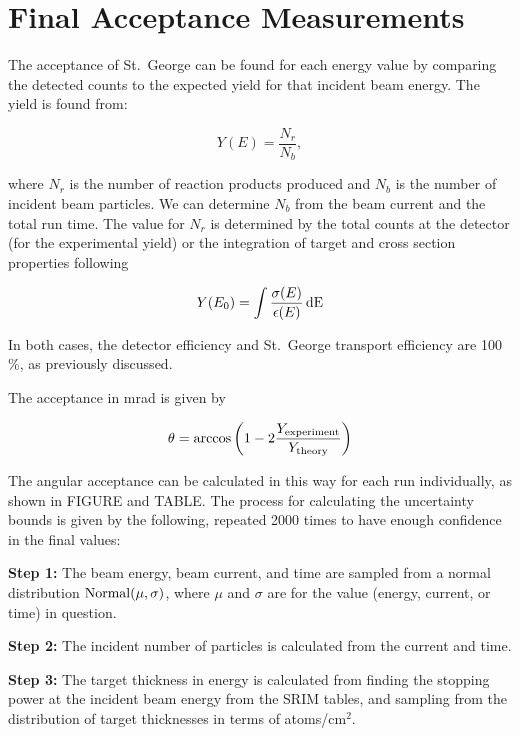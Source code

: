 \section{Final Acceptance Measurements}
\label{sec:final-acceptance-measurements}

The acceptance of St.\ George can be found for each energy value by
comparing the detected counts to the expected yield for that incident
beam energy. The yield is found from:

\begin{equation}
    Y(E) = \frac{N_r}{N_b},
\end{equation}

where $N_r$ is the number of reaction products produced and $N_b$ is the
number of incident beam particles. We can determine $N_b$ from the beam
current and the total run time. The value for $N_r$ is determined by the
total counts at the detector (for the experimental yield) or the
integration of target and cross section properties following

\begin{equation}
    Y(E_0) = \int \frac{\sigma(E)}{\epsilon(E)}\,\rm{d}E
\end{equation}

In both cases, the detector efficiency and St.\ George transport
efficiency are 100\,\%, as previously discussed.

The acceptance in mrad is given by

\begin{equation}
    \theta = \arccos\left(1 - 2 \frac{Y_{\rm experiment}}{Y_{\rm theory}}\right)
\end{equation}

The angular acceptance can be calculated in this way for each run
individually, as shown in FIGURE and TABLE. The process for
calculating the uncertainty bounds is given by the following, repeated
2000 times to have enough confidence in the final values:

\textbf{Step 1:}
  The beam energy, beam current, and time are sampled from a normal
  distribution $\rm{Normal}(\mu,\sigma)$, where $\mu$ and $\sigma$ are for the value
  (energy, current, or time) in question.

\textbf{Step 2:}
  The incident number of particles is calculated from the current and
  time.

\textbf{Step 3:}
  The target thickness in energy is calculated from finding the stopping
  power at the incident beam energy from the SRIM tables, and sampling
  from the distribution of target thicknesses in terms of atoms/cm${}^{2}$.

